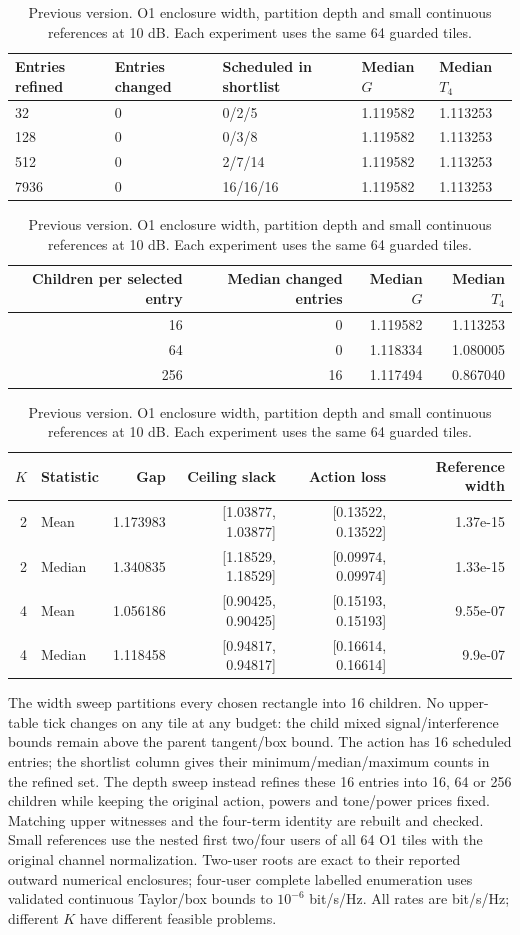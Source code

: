 \documentclass[10pt,letterpaper]{article}
\begin{document}
\begin{table}[p]\color{red}\centering\small
\setlength{\tabcolsep}{4pt}
\caption*{Previous version. O1 enclosure width, partition depth and small continuous references at 10 dB. Each experiment uses the same 64 guarded tiles.}
\begin{tabular}{lllll}\toprule
Entries refined & Entries changed & Scheduled in shortlist & Median $G$ & Median $T_4$\\
\midrule
32 & 0 & 0/2/5 & 1.119582 & 1.113253\\
128 & 0 & 0/3/8 & 1.119582 & 1.113253\\
512 & 0 & 2/7/14 & 1.119582 & 1.113253\\
7936 & 0 & 16/16/16 & 1.119582 & 1.113253\\
\bottomrule\end{tabular}
\par\medskip\begin{minipage}{\linewidth}\small
\par\smallskip\noindent\begin{tabular}{rrrr}\toprule Children per selected entry & Median changed entries & Median $G$ & Median $T_4$\\\midrule
16 & 0 & 1.119582 & 1.113253\\
64 & 0 & 1.118334 & 1.080005\\
256 & 16 & 1.117494 & 0.867040\\
\bottomrule\end{tabular}\par\smallskip
\noindent\begin{tabular}{rlrrrr}\toprule $K$ & Statistic & Gap & Ceiling slack & Action loss & Reference width\\\midrule
2 & Mean & 1.173983 & [1.03877, 1.03877] & [0.13522, 0.13522] & 1.37e-15\\
2 & Median & 1.340835 & [1.18529, 1.18529] & [0.09974, 0.09974] & 1.33e-15\\
4 & Mean & 1.056186 & [0.90425, 0.90425] & [0.15193, 0.15193] & 9.55e-07\\
4 & Median & 1.118458 & [0.94817, 0.94817] & [0.16614, 0.16614] & 9.9e-07\\
\bottomrule\end{tabular}\par\smallskip
The width sweep partitions every chosen rectangle into 16 children. No upper-table tick changes on any tile at any budget: the child mixed signal/interference bounds remain above the parent tangent/box bound. The action has 16 scheduled entries; the shortlist column gives their minimum/median/maximum counts in the refined set. The depth sweep instead refines these 16 entries into 16, 64 or 256 children while keeping the original action, powers and tone/power prices fixed. Matching upper witnesses and the four-term identity are rebuilt and checked. Small references use the nested first two/four users of all 64 O1 tiles with the original channel normalization. Two-user roots are exact to their reported outward numerical enclosures; four-user complete labelled enumeration uses validated continuous Taylor/box bounds to $10^{-6}$ bit/s/Hz. All rates are bit/s/Hz; different $K$ have different feasible problems.
\end{minipage}
\end{table}
\end{document}
